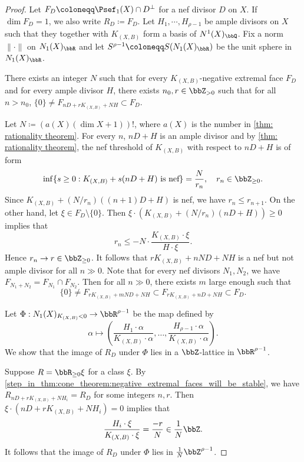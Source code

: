     \begin{proof}
        Let \(F_D \coloneqq \Psef_1(X) \cap D^\perp\) for a nef divisor \(D\) on \(X\).
        If \(\dim F_D = 1\), we also write \(R_D \coloneqq F_D\).
        Let \(H_1,\cdots,H_{\rho-1}\) be ample divisors on \(X\) such that they together with \(K_{(X,B)}\) form a basis of \(N^1(X)_\bbQ\).
        Fix a norm \(\|\cdot\|\) on \(N_1(X)_\bbR\) and let \(S^{\rho-1} \coloneqq S(N_1(X)_\bbR)\) be the unit sphere in \(N_1(X)_\bbR\).

        \begin{step}\label{step_in_thm:cone_theorem:negative_extremal_faces_will_be_stable}
            There exists an integer \(N\) such that for every \(K_{(X,B)}\)-negative extremal face \(F_D\) and for every ample divisor \(H\),
            there exists \(n_0, r \in \bbZ_{>0}\) such that for all \(n>n_0\), \(\{0\} \neq F_{nD+rK_{(X,B)}+N H} \subset F_D\).
        \end{step}
        Let \(N \coloneqq (a(X)(\dim X + 1))!\), where \(a(X)\) is the number in \cref{thm: rationality theorem}.
        For every \(n\), \(nD+H\) is an ample divisor and by \cref{thm: rationality theorem}, the nef threshold of \(K_{(X,B)}\) with respect to \(nD+H\) is of form
        \[ \inf \{s \geq 0: K_{(X,B)} + s(nD+H) \text{ is nef}\} = \frac{N}{r_n}, \quad r_n \in \bbZ_{\geq 0}. \]
        Since \(K_{(X,B)} + (N/r_n)((n+1)D+H)\) is nef, we have \(r_{n} \leq r_{n+1}\).
        On the other hand, let \(\xi \in F_{D}\setminus \{0\}\).
        Then \(\xi \cdot (K_{(X,B)} + (N/r_n)(nD+H)) \geq 0\) implies that
        \[ r_n \leq - N \cdot \frac{K_{(X,B)}\cdot \xi}{H \cdot \xi}. \]
        Hence \(r_n \to r \in \bbZ_{\geq 0}\).
        It follows that \(rK_{(X,B)}+nND+NH\) is a nef but not ample divisor for all \(n \gg 0\).
        Note that for every nef divisors \(N_1,N_2\), we have \(F_{N_1+N_2} = F_{N_1} \cap F_{N_2}\).
        Then for all \(n \gg 0\), there exists \(m\) large enough such that
        \[ \{0\} \neq F_{rK_{(X,B)}+mND+N H} \subset F_{rK_{(X,B)}+nD+NH} \subset F_D. \]

        \begin{step}\label{step_in_thm:cone_theorem:nagetive_extremal_rays_form_a_lattice}
            Let \(\Phi: N_1(X)_{K_{(X,B)}<0} \to \bbR^{\rho-1}\) be the map defined by
            \[ \alpha \mapsto \left( \frac{H_1 \cdot \alpha}{K_{(X,B)}\cdot \alpha},\ldots, \frac{H_{\rho-1} \cdot \alpha}{K_{(X,B)}\cdot \alpha}\right). \]
            We show that the image of \(R_D\) under \(\Phi\) lies in a \(\bbZ\)-lattice in \(\bbR^{\rho-1}\).
        \end{step}
        Suppose \(R = \bbR_{\geq 0}\xi\) for a class \(\xi\).
        By \cref{step_in_thm:cone_theorem:negative_extremal_faces_will_be_stable}, we have \(R_{nD+rK_{(X,B)}+N H_i} = R_{D}\) for some integers \(n,r\).
        Then \( \xi \cdot (nD+rK_{(X,B)}+N H_i) = 0 \) implies that
        \[ \frac{H_i \cdot \xi}{K_{(X,B)}\cdot \xi} = \frac{-r}{N} \in \frac{1}{N}\bbZ. \]
        It follows that the image of \(R_D\) under \(\Phi\) lies in \(\frac{1}{N} \bbZ^{\rho-1}\).


\end{proof}
